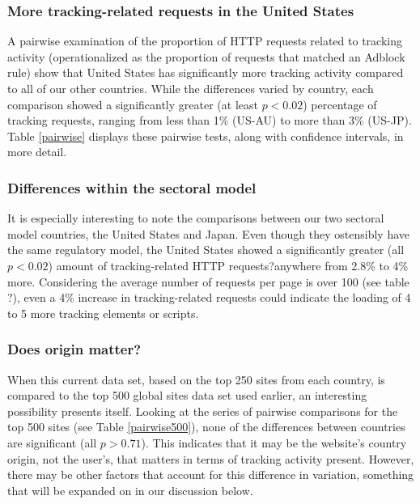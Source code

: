 \documentclass[journal]{IEEEtran}
\begin{document}
\subsubsection{More tracking-related requests in the United States}
A pairwise examination of the proportion of HTTP requests related to tracking activity (operationalized as the proportion of requests that matched an Adblock rule) show that United States has significantly more tracking activity compared to all of our other countries. While the differences varied by country, each comparison showed a significantly greater (at least $p<0.02$) percentage of tracking requests, ranging from less than 1\% (US-AU) to more than 3\% (US-JP). Table \ref{pairwise} displays these pairwise tests, along with confidence intervals, in more detail.

\subsubsection{Differences within the sectoral model}
It is especially interesting to note the comparisons between our two sectoral model countries, the United States and Japan. Even though they ostensibly have the same regulatory model, the United States showed a significantly greater (all $p<0.02$) amount of tracking-related HTTP requests?anywhere from 2.8\% to 4\% more. Considering the average number of requests per page is over 100 (see table ?), even a 4\% increase in tracking-related requests could indicate the loading of 4 to 5 more tracking elements or scripts.

\subsubsection{Does origin matter?}
When this current data set, based on the top 250 sites from each country, is compared to the top 500 global sites data set used earlier, an interesting possibility presents itself. Looking at the series of pairwise comparisons for the top 500 sites (see Table \ref{pairwise500}), none of the differences between countries are significant (all $p>0.71$). This indicates that it may be the website's country origin, not the user's, that matters in terms of tracking activity present. However, there may be other factors that account for this difference in variation, something that will be expanded on in our discussion below.
\end{document}
